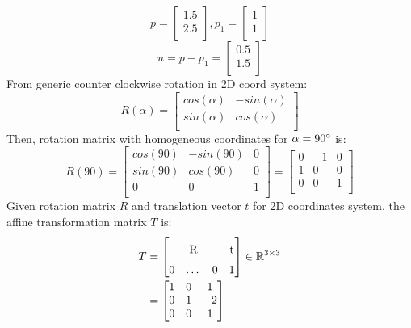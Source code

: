 \documentclass{article}
\begin{document}
\[
    p =
    \begin{bmatrix}
        1.5 \\ 2.5 \\
    \end{bmatrix}
    , p_1 =
    \begin{bmatrix}
        1 \\ 1 \\
    \end{bmatrix}
\]
\[
    u = p - p_1 =
    \begin{bmatrix}
        0.5 \\ 1.5 \\
    \end{bmatrix}
\]
From generic counter clockwise rotation in 2D coord system:
\[
    R(\alpha) =
    \begin{bmatrix}
        cos(\alpha) & -sin(\alpha) \\
        sin(\alpha) & cos(\alpha)  \\
    \end{bmatrix}
\]
Then, rotation matrix with homogeneous coordinates for $\alpha = 90\degree$ is:
\[
    R(90) =
    \begin{bmatrix}
        cos(90) & -sin(90) & 0 \\
        sin(90) & cos(90)  & 0 \\
        0       & 0        & 1 \\
    \end{bmatrix}
    =
    \begin{bmatrix}
        0 & -1 & 0 \\
        1 & 0  & 0 \\
        0 & 0  & 1 \\
    \end{bmatrix}
\]
Given rotation matrix $R$ and translation vector $t$ for 2D coordinates system,
the affine transformation matrix $T$ is:
\begin{equation*}
    \begin{aligned}
        T & =
        \begin{bmatrix}
            \multicolumn{3}{c}{\multirow{2}{*}{R}} & \multirow{2}{*}{t}         \\
            \multicolumn{4}{c}{}                                                \\
            0                                      & \dots              & 0 & 1 \\
        \end{bmatrix}
        \in \mathbb{R}^{3 \times 3} \\[-0.2ex]
          & = \begin{bmatrix}
                  1 & 0 & 1  \\
                  0 & 1 & -2 \\
                  0 & 0 & 1  \\
              \end{bmatrix}
    \end{aligned}
\end{equation*}
\end{document}
